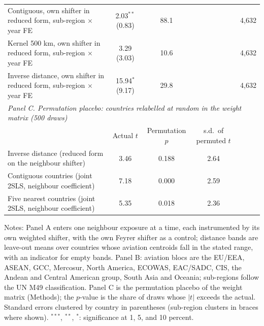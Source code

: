 \documentclass[12pt]{extarticle}
\begin{document}
\begin{table}[H]
{\begin{threeparttable}
\begin{tabular}{lcccc}
  Contiguous, own shifter in reduced form, sub-region $\times$ year FE & 2.03$^{**}$ (0.83) & 88.1 & & 4,632 \\
  Kernel 500 km, own shifter in reduced form, sub-region $\times$ year FE & 3.29 (3.03) & 10.6 & & 4,632 \\
  Inverse distance, own shifter in reduced form, sub-region $\times$ year FE & 15.94$^{*}$ (9.17) & 29.8 & & 4,632 \\
\midrule
\multicolumn{5}{l}{\textit{Panel C. Permutation placebo: countries relabelled at random in the weight matrix (500 draws)}} \\
 & Actual $t$ & Permutation $p$ & s.d.\ of permuted $t$ & \\
  Inverse distance (reduced form on the neighbour shifter) & 3.46 & 0.188 & 2.64 & \\
  Contiguous countries (joint 2SLS, neighbour coefficient) & 7.18 & 0.000 & 2.59 & \\
  Five nearest countries (joint 2SLS, neighbour coefficient) & 5.35 & 0.018 & 2.36 & \\
\bottomrule
\end{tabular}
\begin{tablenotes}[flushleft]
\scriptsize
\item Notes: Panel A enters one neighbour exposure at a time, each instrumented by its own weighted shifter, with the own Feyrer shifter as a control; distance bands are leave-out means over countries whose aviation centroids fall in the stated range, with an indicator for empty bands. Panel B: aviation blocs are the EU/EEA, ASEAN, GCC, Mercosur, North America, ECOWAS, EAC/SADC, CIS, the Andean and Central American group, South Asia and Oceania; sub-regions follow the UN M49 classification. Panel C is the permutation placebo of the weight matrix (Methods); the $p$-value is the share of draws whose $|t|$ exceeds the actual. Standard errors clustered by country in parentheses (sub-region clusters in braces where shown). $^{***}$, $^{**}$, $^{*}$: significance at 1, 5, and 10 percent.
\end{tablenotes}
\end{threeparttable}}
\end{table}
\end{document}
